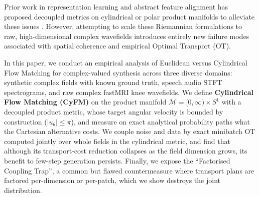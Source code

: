 Prior work in representation learning and abstract feature alignment has proposed decoupled metrics on cylindrical or polar product manifolds to alleviate these issues \citep{chen2026dpfm, wang2026disrfm}. However, attempting to scale these Riemannian formulations to raw, high-dimensional complex wavefields introduces entirely new failure modes associated with spatial coherence and empirical Optimal Transport (OT). 

In this paper, we conduct an empirical analysis of Euclidean versus Cylindrical Flow Matching for complex-valued synthesis across three diverse domains: synthetic complex fields with known ground truth, speech audio STFT spectrograms, and raw complex fastMRI knee wavefields. We define \textbf{Cylindrical Flow Matching (CyFM)} on the product manifold $\mathcal{M} = [0, \infty) \times S^1$ with a decoupled product metric, whose target angular velocity is bounded by construction ($|u_\theta| \le \pi$), and measure on exact analytical probability paths what the Cartesian alternative costs. We couple noise and data by exact minibatch OT computed jointly over whole fields in the cylindrical metric, and find that although its transport-cost reduction collapses as the field dimension grows, its benefit to few-step generation persists. Finally, we expose the ``Factorised Coupling Trap'', a common but flawed countermeasure where transport plans are factored per-dimension or per-patch, which we show destroys the joint distribution.

